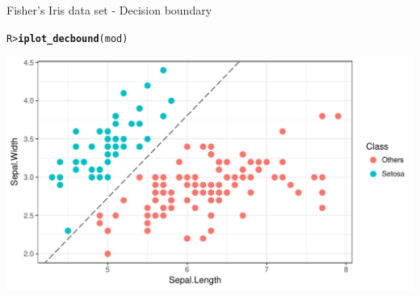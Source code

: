 \documentclass{beamer}\usepackage[]{graphicx}\usepackage[]{color}
\makeatletter
\def\maxwidth{ %
  \ifdim\Gin@nat@width>\linewidth
    \linewidth
  \else
    \Gin@nat@width
  \fi
}
\newcommand{\hlstd}[1]{\textcolor[rgb]{0.345,0.345,0.345}{#1}}%
\newcommand{\hlkwd}[1]{\textcolor[rgb]{0.737,0.353,0.396}{\textbf{#1}}}%
\newenvironment{kframe}{%
 \def\at@end@of@kframe{}%
 \ifinner\ifhmode%
  \def\at@end@of@kframe{\end{minipage}}%
  \begin{minipage}{\columnwidth}%
 \fi\fi%
 \def\FrameCommand##1{\hskip\@totalleftmargin \hskip-\fboxsep
 \colorbox{shadecolor}{##1}\hskip-\fboxsep
     \hskip-\linewidth \hskip-\@totalleftmargin \hskip\columnwidth}%
 \MakeFramed {\advance\hsize-\width
   \@totalleftmargin\z@ \linewidth\hsize
   \@setminipage}}%
 {\par\unskip\endMakeFramed%
 \at@end@of@kframe}
\newenvironment{knitrout}{}{} %
\makeatother
\begin{document}
\begin{frame}[fragile]{Fisher's Iris data set - Decision boundary}
\vspace{-5pt}
\begin{knitrout}\small
{}\color{fgcolor}\begin{kframe}
\begin{alltt}
\hlstd{R> }\hlkwd{iplot_decbound}\hlstd{(mod)}
\end{alltt}
\end{kframe}

{\centering \includegraphics[width=\maxwidth]{figure/unnamed-chunk-4-1} 

}



\end{knitrout}
\end{frame}
\end{document}
